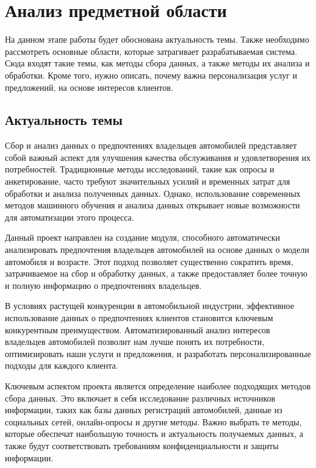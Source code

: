 \section{Анализ предметной области}

На данном этапе работы будет обоснована актуальность темы. Также необходимо рассмотреть основные области, которые затрагивает разрабатываемая система. Сюда входят такие темы, как методы сбора данных, а также методы их анализа и обработки. Кроме того, нужно описать, почему важна персонализация услуг и предложений, на основе интересов клиентов.

\subsection{Актуальность темы}

Сбор и анализ данных о предпочтениях владельцев автомобилей представляет собой важный аспект для улучшения качества обслуживания и удовлетворения их потребностей. Традиционные методы исследований, такие как опросы и анкетирование, часто требуют значительных усилий и временных затрат для обработки и анализа полученных данных. Однако, использование современных методов машинного обучения и анализа данных открывает новые возможности для автоматизации этого процесса.

Данный проект направлен на создание модуля, способного автоматически анализировать предпочтения владельцев автомобилей на основе данных о модели автомобиля и возрасте. Этот подход позволяет существенно сократить время, затрачиваемое на сбор и обработку данных, а также предоставляет более точную и полную информацию о предпочтениях владельцев.

В условиях растущей конкуренции в автомобильной индустрии, эффективное использование данных о предпочтениях клиентов становится ключевым конкурентным преимуществом. Автоматизированный анализ интересов владельцев автомобилей позволит нам лучше понять их потребности, оптимизировать наши услуги и предложения, и разработать персонализированные подходы для каждого клиента.

Ключевым аспектом проекта является определение наиболее подходящих методов сбора данных. Это включает в себя исследование различных источников информации, таких как базы данных регистраций автомобилей, данные из социальных сетей, онлайн-опросы и другие методы. Важно выбрать те методы, которые обеспечат наибольшую точность и актуальность получаемых данных, а также будут соответствовать требованиям конфиденциальности и защиты информации.

